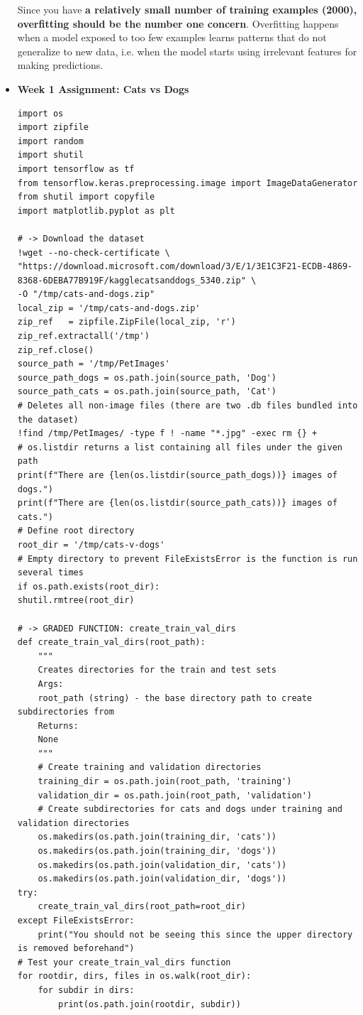 \documentclass[20pt]{article}
\begin{document}
\begin{itemize}
		Since you have \textbf{a relatively small number of training examples (2000), overfitting should be the number one concern}. Overfitting happens when a model exposed to too few examples learns patterns that do not generalize to new data, i.e. when the model starts using irrelevant features for making predictions.
		\item \textbf{Week 1 Assignment: Cats vs Dogs}\\
		\begin{verbatim}
import os
import zipfile
import random
import shutil
import tensorflow as tf
from tensorflow.keras.preprocessing.image import ImageDataGenerator
from shutil import copyfile
import matplotlib.pyplot as plt

# -> Download the dataset
!wget --no-check-certificate \
"https://download.microsoft.com/download/3/E/1/3E1C3F21-ECDB-4869-8368-6DEBA77B919F/kagglecatsanddogs_5340.zip" \
-O "/tmp/cats-and-dogs.zip"
local_zip = '/tmp/cats-and-dogs.zip'
zip_ref   = zipfile.ZipFile(local_zip, 'r')
zip_ref.extractall('/tmp')
zip_ref.close()
source_path = '/tmp/PetImages'
source_path_dogs = os.path.join(source_path, 'Dog')
source_path_cats = os.path.join(source_path, 'Cat')
# Deletes all non-image files (there are two .db files bundled into the dataset)
!find /tmp/PetImages/ -type f ! -name "*.jpg" -exec rm {} +
# os.listdir returns a list containing all files under the given path
print(f"There are {len(os.listdir(source_path_dogs))} images of dogs.")
print(f"There are {len(os.listdir(source_path_cats))} images of cats.")
# Define root directory
root_dir = '/tmp/cats-v-dogs'
# Empty directory to prevent FileExistsError is the function is run several times
if os.path.exists(root_dir):
shutil.rmtree(root_dir)

# -> GRADED FUNCTION: create_train_val_dirs
def create_train_val_dirs(root_path):
	"""
	Creates directories for the train and test sets
	Args:
	root_path (string) - the base directory path to create subdirectories from
	Returns:
	None
	"""
	# Create training and validation directories
	training_dir = os.path.join(root_path, 'training')
	validation_dir = os.path.join(root_path, 'validation')
	# Create subdirectories for cats and dogs under training and validation directories
	os.makedirs(os.path.join(training_dir, 'cats'))
	os.makedirs(os.path.join(training_dir, 'dogs'))
	os.makedirs(os.path.join(validation_dir, 'cats'))
	os.makedirs(os.path.join(validation_dir, 'dogs'))
try:
	create_train_val_dirs(root_path=root_dir)
except FileExistsError:
	print("You should not be seeing this since the upper directory is removed beforehand")
# Test your create_train_val_dirs function
for rootdir, dirs, files in os.walk(root_dir):
	for subdir in dirs:
		print(os.path.join(rootdir, subdir))


\end{verbatim}
\end{itemize}
\end{document}
